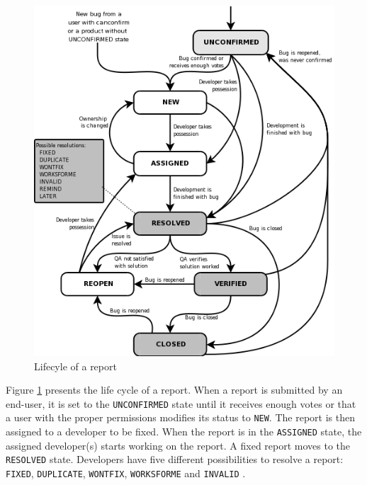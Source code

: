 \begin{figure}[h!]
	\centering
	\includegraphics[scale=0.7]{media/bzLifecycle.png}
	\caption{Lifecyle of a report \cite{Bugzilla2008}}
	\label{fig:bug-lifecyle}
\end{figure}

Figure \ref{fig:bug-lifecyle} presents the life cycle of a report.
When a report is submitted by an end-user, it is set to the {\tt UNCONFIRMED} state until it receives enough votes or that a user with the proper permissions modifies its status to {\tt NEW}.
The report is then assigned to a developer to be fixed.
When the report is in the {\tt ASSIGNED} state, the assigned developer(s) starts working on the report.
A fixed report moves to the {\tt RESOLVED} state. Developers have five different possibilities to resolve a report: {\tt FIXED}, {\tt DUPLICATE}, {\tt WONTFIX}, {\tt WORKSFORME} and {\tt INVALID} \cite{Koponen2006}.

